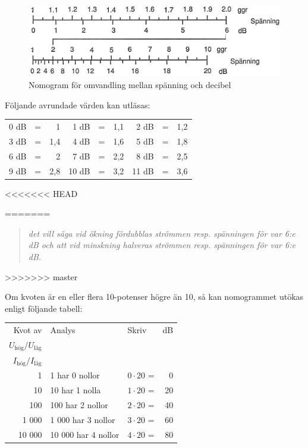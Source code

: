 \begin{figure}
  \includegraphics[width=\textwidth]{images/nomogram_db_spanning.png}
  \caption{Nomogram för omvandling mellan spänning och decibel}
  \label{ellära-nomogram-db-spänning}
\end{figure}

Följande avrundade värden kan utläsas:

\vspace{\baselineskip}

\begin{tabular}{rcr|rcr|rcr}
	0 dB & = &   1 &  1 dB & = & 1,1 &  2 dB & = & 1,2 \\
	3 dB & = & 1,4 &  4 dB & = & 1,6 &  5 dB & = & 1,8 \\
	6 dB & = &   2 &  7 dB & = & 2,2 &  8 dB & = & 2,5 \\
	9 dB & = & 2,8 & 10 dB & = & 3,2 & 11 dB & = & 3,6
\end{tabular}

<<<<<<< HEAD
\vspace{\baselineskip}

=======
\begin{quote}\emph{
det vill säga vid ökning fördubblas strömmen resp. spänningen för var 6:e dB
och att vid minskning halveras strömmen resp. spänningen för var 6:e dB.
}\end{quote}
>>>>>>> master

Om kvoten är en eller flera 10-potenser högre än 10, så kan nomogrammet utökas
enligt följande tabell:

\vspace{\baselineskip}

\begin{tabular}{rllr}
Kvot av & Analys             & Skriv            & dB \\
\(U_\text{hög}/U_\text{låg}\) &          &                  &    \\
\(I_\text{hög}/I_\text{låg}\) &          &                  &    \\
     1 & 1 har 0 nollor      & \(0 \cdot 20\) = &  0 \\
    10 & 10 har 1 nolla      & \(1 \cdot 20\) = & 20 \\
   100 & 100 har 2 nollor    & \(2 \cdot 20\) = & 40 \\
 1 000 &  1 000 har 3 nollor & \(3 \cdot 20\) = & 60 \\
10 000 & 10 000 har 4 nollor & \(4 \cdot 20\) = & 80
\end{tabular}

